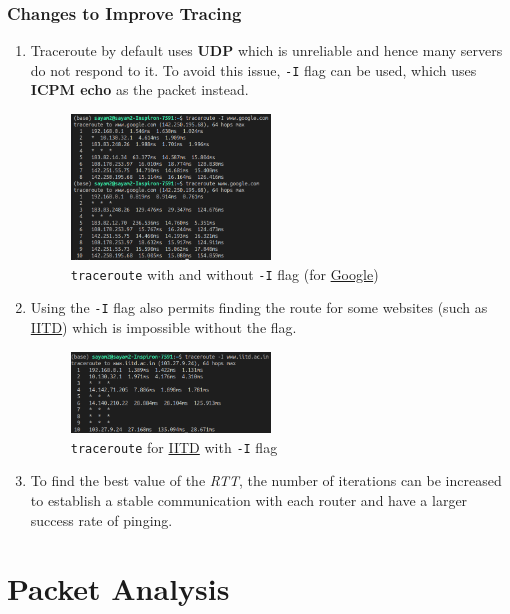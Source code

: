 \documentclass[11pt]{article}
\begin{document}
\subsubsection{Changes to Improve Tracing}
\begin{enumerate}
    \item Traceroute by default uses \textbf{UDP} which is unreliable and hence many servers do not respond to it. To avoid this issue, \texttt{-I} flag can be used, which uses \textbf{ICPM echo} as the packet instead.
        \begin{figure}[H]
            \centering
            \includegraphics[width=0.5\textwidth]{traceroute_better_google}
            \caption{\texttt{traceroute} with and without \texttt{-I} flag (for \href{https://www.google.com}{Google})}
        \end{figure}
    \item Using the \texttt{-I} flag also permits finding the route for some websites (such as \href{https://www.iitd.ac.in}{IITD}) which is impossible without the flag.
        \begin{figure}[H]
            \centering
            \includegraphics[width=0.5\textwidth]{traceroute_better_iitd}
            \caption{\texttt{traceroute} for \href{https://www.iitd.ac.in}{IITD} with \texttt{-I} flag}
        \end{figure}
    \item To find the best value of the \textit{RTT}, the number of iterations can be increased to establish a stable communication with each router and have a larger success rate of pinging.
\end{enumerate}


\section{Packet Analysis}
\end{document}
